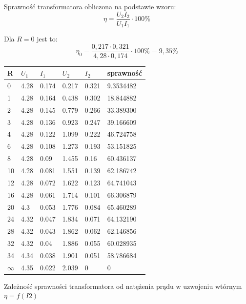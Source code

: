 \documentclass[a4paper, 11pt]{article}
\begin{document}
Sprawność transformatora obliczona na podstawie wzoru:
\[
	\eta = \frac{U_2I_2}{U_1I_1} \cdot 100\%
\]

Dla $R = 0$ jest to:
\[
	\eta_0 = \frac{0,217 \cdot 0,321}{4,28 \cdot 0,174} \cdot 100\% = 9,35\%
\]

\begin{center}
	\begin{tabular}{|l|l|l|l|l|l|}
		\hline
		R        & $U_1$ & $I_1$ & $U_2$ & $I_2$ & sprawność  \\ \hline
		0        & 4.28  & 0.174 & 0.217 & 0.321 & 9.3534482 \\ \hline
		1        & 4.28  & 0.164 & 0.438 & 0.302 & 18.844882 \\ \hline
		2        & 4.28  & 0.145 & 0.779 & 0.266 & 33.389300 \\ \hline
		3        & 4.28  & 0.136 & 0.923 & 0.247 & 39.166609 \\ \hline
		4        & 4.28  & 0.122 & 1.099 & 0.222 & 46.724758 \\ \hline
		6        & 4.28  & 0.108 & 1.273 & 0.193 & 53.151825 \\ \hline
		8        & 4.28  & 0.09  & 1.455 & 0.16  & 60.436137 \\ \hline
		10       & 4.28  & 0.081 & 1.551 & 0.139 & 62.186742 \\ \hline
		12       & 4.28  & 0.072 & 1.622 & 0.123 & 64.741043 \\ \hline
		16       & 4.28  & 0.061 & 1.714 & 0.101 & 66.306879 \\ \hline
		20       & 4.3   & 0.053 & 1.776 & 0.084 & 65.460289 \\ \hline
		24       & 4.32  & 0.047 & 1.834 & 0.071 & 64.132190 \\ \hline
		28       & 4.32  & 0.043 & 1.862 & 0.062 & 62.146856 \\ \hline
		32       & 4.32  & 0.04  & 1.886 & 0.055 & 60.028935 \\ \hline
		34       & 4.34  & 0.038 & 1.901 & 0.051 & 58.786684 \\ \hline
		$\infty$ & 4.35  & 0.022 & 2.039 & 0     & 0         \\ \hline
	\end{tabular}

	\vspace{1cm}
	\large Zależność sprawności transformatora od natężenia prądu w uzwojeniu wtórnym $\eta = f(I2)$


\end{center}
\end{document}
